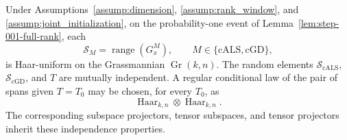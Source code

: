 \begin{lemma}\label{lem:step-001-haar-independence}
Under Assumptions~\ref{assump:dimension}, \ref{assump:rank_window}, and
\ref{assump:joint_initialization}, on the probability-one event of
Lemma~\ref{lem:step-001-full-rank}, each
\[
 \mathcal S_M=\operatorname{range}(G_x^M),
 \qquad M\in\{\mathrm{cALS},\mathrm{cGD}\},
\]
is Haar-uniform on the Grassmannian $\operatorname{Gr}(k,n)$.  The random
elements $\mathcal S_{\mathrm{cALS}}$, $\mathcal S_{\mathrm{cGD}}$, and $T$
are mutually independent.  A regular conditional law of the pair of spans
given $T=T_0$ may be chosen, for every $T_0$, as
\[
 \operatorname{Haar}_{k,n}\otimes\operatorname{Haar}_{k,n}.
\]
The corresponding subspace projectors, tensor subspaces, and tensor
projectors inherit these independence properties.
\end{lemma}

